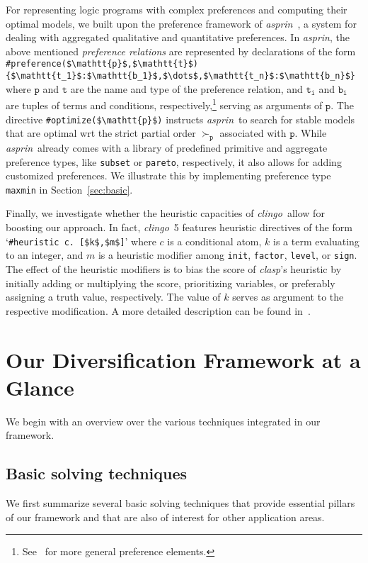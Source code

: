 \documentclass[a4paper,USenglish]{oasics-v2016}
\newcommand{\sysfont}{\textit}
\newcommand{\asprin}{\sysfont{asprin}}
\newcommand{\clasp}{\sysfont{clasp}}
\newcommand{\clingo}{\sysfont{clingo}}
\begin{document}
For representing logic programs with complex preferences and computing their optimal models,
we built upon the preference framework of \asprin~\cite{brderosc15a},
a system for dealing with aggregated qualitative and quantitative preferences.
%
In \asprin, the above mentioned \emph{preference relations} are represented by declarations of the form
\lstinline[mathescape]!#preference($\mathtt{p}$,$\mathtt{t}$){$\mathtt{t_1}$:$\mathtt{b_1}$,$\dots$,$\mathtt{t_n}$:$\mathtt{b_n}$}!
where $\mathtt{p}$ and $\mathtt{t}$ are the name and type of the preference relation, %
and $\mathtt{t_i}$ and $\mathtt{b_i}$ are tuples of terms and conditions, respectively,\footnote{
See~\cite{brderosc15a} %
for more general preference elements.}
%
serving as arguments of $\mathtt{p}$.
%
The directive \lstinline[mathescape]!#optimize($\mathtt{p}$)! instructs \asprin\ to search for stable models that are optimal wrt the strict partial order
$\succ_{\mathtt{p}}$ associated with $\mathtt{p}$.
%
While \asprin\ already comes with a library of predefined primitive and aggregate preference types, like \texttt{subset} or \texttt{pareto},
respectively,
it also allows for adding customized preferences.
%
We illustrate this by implementing preference type \texttt{maxmin} in Section~\ref{sec:basic}.
%

Finally,
we investigate whether the heuristic capacities of \clingo\ allow for boosting our approach.
%
In fact, \clingo~5 features heuristic directives of the form
`\lstinline[mathescape]!#heuristic c. [$k$,$m$]!'
where $c$ is a conditional atom,
$k$ is a term evaluating to an integer, and 
$m$ is a heuristic modifier among
\lstinline{init}, \lstinline{factor}, \lstinline{level},  or \lstinline{sign}. %
%
The effect of the heuristic modifiers is to bias the score of \clasp's heuristic by
initially adding or multiplying the score,
prioritizing variables, or
preferably assigning a truth value, respectively.
%
The value of $k$ serves as argument to the respective modification.
%
A more detailed description can be found in~\cite{gekaotroscwa13a}.

\section{Our Diversification Framework at a Glance}\label{sec:overview}

We begin with an overview over the various techniques integrated in our framework.

\subsection{Basic solving techniques}
%
We first summarize several basic solving techniques that provide essential pillars of our framework
and that are also of interest for other application areas.
\end{document}
